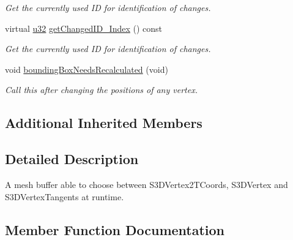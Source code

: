 \begin{DoxyCompactItemize}
\begin{DoxyCompactList}\small\item\em Get the currently used ID for identification of changes. \end{DoxyCompactList}\item 
virtual \hyperlink{namespaceirr_a0416a53257075833e7002efd0a18e804}{u32} \hyperlink{structirr_1_1scene_1_1SSkinMeshBuffer_a60b444cfe4b0cec6d2cc4bdf7958dd16}{get\+Changed\+I\+D\+\_\+\+Index} () const
\begin{DoxyCompactList}\small\item\em Get the currently used ID for identification of changes. \end{DoxyCompactList}\item 
\mbox{\label{structirr_1_1scene_1_1SSkinMeshBuffer_af3460f6a2bb4b53b60d03d162f0d6fa6}} 
void \hyperlink{structirr_1_1scene_1_1SSkinMeshBuffer_af3460f6a2bb4b53b60d03d162f0d6fa6}{bounding\+Box\+Needs\+Recalculated} (void)
\begin{DoxyCompactList}\small\item\em Call this after changing the positions of any vertex. \end{DoxyCompactList}\end{DoxyCompactItemize}
\subsection*{Additional Inherited Members}


\subsection{Detailed Description}
A mesh buffer able to choose between S3\+D\+Vertex2\+T\+Coords, S3\+D\+Vertex and S3\+D\+Vertex\+Tangents at runtime. 

\subsection{Member Function Documentation}
\mbox{\label{structirr_1_1scene_1_1SSkinMeshBuffer_a60b444cfe4b0cec6d2cc4bdf7958dd16}} 
